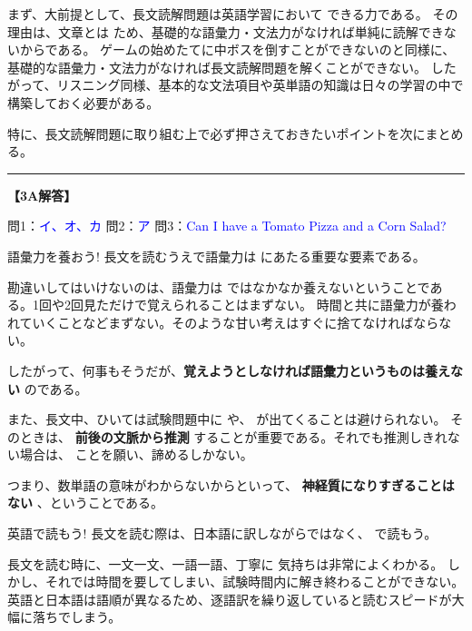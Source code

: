 まず、大前提として、長文読解問題は英語学習において  できる力である。
その理由は、文章とは  ため、基礎的な語彙力・文法力がなければ単純に読解できないからである。
ゲームの始めたてに中ボスを倒すことができないのと同様に、基礎的な語彙力・文法力がなければ長文読解問題を解くことができない。
したがって、リスニング同様、基本的な文法項目や英単語の知識は日々の学習の中で構築しておく必要がある。

特に、長文読解問題に取り組む上で必ず押さえておきたいポイントを次にまとめる。


\vfill
\noindent\rule{\textwidth}{0.4pt}
\vspace{0.2em}
\noindent
\textbf{【3A解答】}\par\vspace{0.1em}%
問1：\textcolor{blue}{イ、オ、カ}\qquad
問2：\textcolor{blue}{ア}\qquad
問3：\textcolor{blue}{Can I have a Tomato Pizza and a Corn Salad?}%
\newpage

\begin{techniquebox}{語彙力を養おう!}
    長文を読むうえで語彙力は  にあたる重要な要素である。
\end{techniquebox}

勘違いしてはいけないのは、語彙力は  ではなかなか養えないということである。1回や2回見ただけで覚えられることはまずない。
時間と共に語彙力が養われていくことなどまずない。そのような甘い考えはすぐに捨てなければならない。

したがって、何事もそうだが、\textbf{覚えようとしなければ語彙力というものは養えない} のである。

また、長文中、ひいては試験問題中に  や、  が出てくることは避けられない。
そのときは、 \textbf{前後の文脈から推測} することが重要である。それでも推測しきれない場合は、  ことを願い、諦めるしかない。

つまり、数単語の意味がわからないからといって、 \textbf{神経質になりすぎることはない} 、ということである。

\vspace{1.5em}
\begin{techniquebox}{英語で読もう!}
    長文を読む際は、日本語に訳しながらではなく、  で読もう。
\end{techniquebox}

長文を読む時に、一文一文、一語一語、丁寧に  気持ちは非常によくわかる。
しかし、それでは時間を要してしまい、試験時間内に解き終わることができない。英語と日本語は語順が異なるため、逐語訳を繰り返していると読むスピードが大幅に落ちでしまう。

